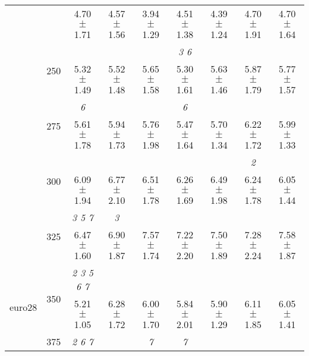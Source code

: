 \begin{table}[h]
{\begin{tabular}{
        ccccccccc}
 & & \cellcolor[HTML]{EFEFEF} 4.70 $\pm$ 1.71& \cellcolor[HTML]{EFEFEF} 4.57 $\pm$ 1.56& \cellcolor[HTML]{EFEFEF} 3.94 $\pm$ 1.29& \cellcolor[HTML]{EFEFEF} 4.51 $\pm$ 1.38& \cellcolor[HTML]{EFEFEF} 4.39 $\pm$ 1.24& \cellcolor[HTML]{EFEFEF} 4.70 $\pm$ 1.91& \cellcolor[HTML]{EFEFEF} 4.70 $\pm$ 1.64 \\ 
 & \multirow{2}{*}{250}& & & & \textit{ 3 6 }& & &  \\ 
 & & 5.32 $\pm$ 1.49& 5.52 $\pm$ 1.48& 5.65 $\pm$ 1.58& 5.30 $\pm$ 1.61& 5.63 $\pm$ 1.46& 5.87 $\pm$ 1.79& 5.77 $\pm$ 1.57 \\ 
 & \multirow{2}{*}{275}& \cellcolor[HTML]{EFEFEF} \textit{ 6 }& \cellcolor[HTML]{EFEFEF} & \cellcolor[HTML]{EFEFEF} & \cellcolor[HTML]{EFEFEF} \textit{ 6 }& \cellcolor[HTML]{EFEFEF} & \cellcolor[HTML]{EFEFEF} & \cellcolor[HTML]{EFEFEF}  \\ 
 & & \cellcolor[HTML]{EFEFEF} 5.61 $\pm$ 1.78& \cellcolor[HTML]{EFEFEF} 5.94 $\pm$ 1.73& \cellcolor[HTML]{EFEFEF} 5.76 $\pm$ 1.98& \cellcolor[HTML]{EFEFEF} 5.47 $\pm$ 1.64& \cellcolor[HTML]{EFEFEF} 5.70 $\pm$ 1.34& \cellcolor[HTML]{EFEFEF} 6.22 $\pm$ 1.72& \cellcolor[HTML]{EFEFEF} 5.99 $\pm$ 1.33 \\ 
 & \multirow{2}{*}{300}& & & & & & \textit{ 2 }&  \\ 
 & & 6.09 $\pm$ 1.94& 6.77 $\pm$ 2.10& 6.51 $\pm$ 1.78& 6.26 $\pm$ 1.69& 6.49 $\pm$ 1.98& 6.24 $\pm$ 1.78& 6.05 $\pm$ 1.44 \\ 
 & \multirow{2}{*}{325}& \cellcolor[HTML]{EFEFEF} \textit{ 3 5 7 }& \cellcolor[HTML]{EFEFEF} \textit{ 3 }& \cellcolor[HTML]{EFEFEF} & \cellcolor[HTML]{EFEFEF} & \cellcolor[HTML]{EFEFEF} & \cellcolor[HTML]{EFEFEF} & \cellcolor[HTML]{EFEFEF}  \\ 
 & & \cellcolor[HTML]{EFEFEF} 6.47 $\pm$ 1.60& \cellcolor[HTML]{EFEFEF} 6.90 $\pm$ 1.87& \cellcolor[HTML]{EFEFEF} 7.57 $\pm$ 1.74& \cellcolor[HTML]{EFEFEF} 7.22 $\pm$ 2.20& \cellcolor[HTML]{EFEFEF} 7.50 $\pm$ 1.89& \cellcolor[HTML]{EFEFEF} 7.28 $\pm$ 2.24& \cellcolor[HTML]{EFEFEF} 7.58 $\pm$ 1.87 \\ 
 \multirow{4}{*}{euro28} & \multirow{2}{*}{350}& \textit{ 2 3 5 6 7 }& & & & & &  \\ 
 & & 5.21 $\pm$ 1.05& 6.28 $\pm$ 1.72& 6.00 $\pm$ 1.70& 5.84 $\pm$ 2.01& 5.90 $\pm$ 1.29& 6.11 $\pm$ 1.85& 6.05 $\pm$ 1.41 \\ 
 & \multirow{2}{*}{375}& \cellcolor[HTML]{EFEFEF} \textit{ 2 6 7 }& \cellcolor[HTML]{EFEFEF} & \cellcolor[HTML]{EFEFEF} \textit{ 7 }& \cellcolor[HTML]{EFEFEF} \textit{ 7 }& \cellcolor[HTML]{EFEFEF} & \cellcolor[HTML]{EFEFEF} & \cellcolor[HTML]{EFEFEF}  \\ 

\end{tabular}}
\end{table}

